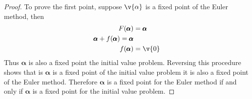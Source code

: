 \documentclass[11pt]{article}
\begin{document}
\begin{enumerate}
\begin{enumerate}
                \begin{proof}
                    To prove the first point, suppose $\v{\alpha}$ is a fixed point
                    of the Euler method, then
                    \begin{align*}
                        F(\pmb{\alpha}) &= \pmb{\alpha} \\
                        \pmb{\alpha} + f(\pmb{\alpha}) =  \pmb{\alpha} \\
                        f(\pmb{\alpha}) &= \v{0}
                    \end{align*}
                    Thus $\pmb{\alpha}$ is also a fixed point the initial value
                    problem.
                    Reversing this procedure shows that is $\pmb{\alpha}$ is
                    a fixed point of the initial value problem it is also
                    a fixed point of the Euler method.
                    Therefore $\pmb{\alpha}$ is a fixed point for the Euler method
                    if and only if $\pmb{\alpha}$ is a fixed point for the initial
                    value problem.


\end{proof}
\end{enumerate}
\end{enumerate}
\end{document}
